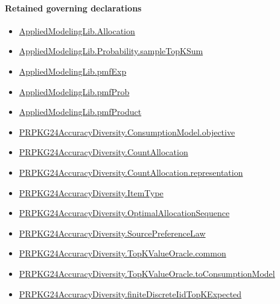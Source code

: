 \documentclass[10pt]{article}
\begin{document}
\paragraph{Retained governing declarations}
\begin{itemize}\raggedright
\item \hyperlink{governing-declaration-6972368b41f26c5a}{Applied\allowbreak{}Modeling\allowbreak{}Lib.\allowbreak{}Allocation}
\item \hyperlink{governing-declaration-22d71048ad4584e9}{Applied\allowbreak{}Modeling\allowbreak{}Lib.\allowbreak{}Probability.\allowbreak{}sample\allowbreak{}Top\allowbreak{}K\allowbreak{}Sum}
\item \hyperlink{governing-declaration-8e4b4389a4f6454b}{Applied\allowbreak{}Modeling\allowbreak{}Lib.\allowbreak{}pmf\allowbreak{}Exp}
\item \hyperlink{governing-declaration-9c38d53b9d664221}{Applied\allowbreak{}Modeling\allowbreak{}Lib.\allowbreak{}pmf\allowbreak{}Prob}
\item \hyperlink{governing-declaration-5ac12d0a52b69068}{Applied\allowbreak{}Modeling\allowbreak{}Lib.\allowbreak{}pmf\allowbreak{}Product}
\item \hyperlink{governing-declaration-3ab045ef5e79a864}{PRPKG24\allowbreak{}Accuracy\allowbreak{}Diversity.\allowbreak{}Consumption\allowbreak{}Model.\allowbreak{}objective}
\item \hyperlink{governing-declaration-4fbd8fa467bd5d78}{PRPKG24\allowbreak{}Accuracy\allowbreak{}Diversity.\allowbreak{}Count\allowbreak{}Allocation}
\item \hyperlink{paper-prerequisite-29fb13a9ce74aef5}{PRPKG24\allowbreak{}Accuracy\allowbreak{}Diversity.\allowbreak{}Count\allowbreak{}Allocation.\allowbreak{}representation}
\item \hyperlink{governing-declaration-562ef32e180a12be}{PRPKG24\allowbreak{}Accuracy\allowbreak{}Diversity.\allowbreak{}Item\allowbreak{}Type}
\item \hyperlink{governing-declaration-98821e74d0c4230b}{PRPKG24\allowbreak{}Accuracy\allowbreak{}Diversity.\allowbreak{}Optimal\allowbreak{}Allocation\allowbreak{}Sequence}
\item \hyperlink{governing-declaration-e662f313179ba80f}{PRPKG24\allowbreak{}Accuracy\allowbreak{}Diversity.\allowbreak{}Source\allowbreak{}Preference\allowbreak{}Law}
\item \hyperlink{governing-declaration-485fb8480f5523e0}{PRPKG24\allowbreak{}Accuracy\allowbreak{}Diversity.\allowbreak{}Top\allowbreak{}K\allowbreak{}Value\allowbreak{}Oracle.\allowbreak{}common}
\item \hyperlink{governing-declaration-588a2f7919921f81}{PRPKG24\allowbreak{}Accuracy\allowbreak{}Diversity.\allowbreak{}Top\allowbreak{}K\allowbreak{}Value\allowbreak{}Oracle.\allowbreak{}to\allowbreak{}Consumption\allowbreak{}Model}
\item \hyperlink{governing-declaration-466574133e81ace2}{PRPKG24\allowbreak{}Accuracy\allowbreak{}Diversity.\allowbreak{}finite\allowbreak{}Discrete\allowbreak{}Iid\allowbreak{}Top\allowbreak{}K\allowbreak{}Expected}
\end{itemize}
\end{document}
